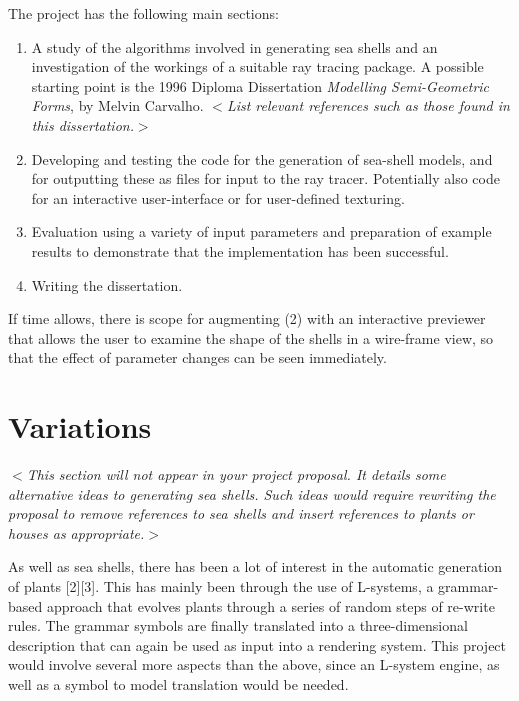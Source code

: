 \documentclass[12pt]{article}
\newcommand{\al}{$<$}
\newcommand{\ar}{$>$}
\begin{document}
The project has the following main sections:

\begin{enumerate}

\item A study of the algorithms involved in generating sea shells and
  an investigation of the workings of a suitable ray tracing package.
  A possible starting point is the 1996 Diploma Dissertation
  \emph{Modelling Semi-Geometric Forms}, by Melvin Carvalho.
  \al\emph{List relevant references such as those found in this
    dissertation.}\ar

\item Developing and testing the code for the generation of sea-shell
  models, and for outputting these as files for input to the ray
  tracer.  Potentially also code for an interactive user-interface or
  for user-defined texturing.

\item Evaluation using a variety of input parameters and preparation
  of example results to demonstrate that the implementation has been
  successful.

\item Writing the dissertation.

\end{enumerate}

If time allows, there is scope for augmenting (2) with an interactive
previewer that allows the user to examine the shape of the shells in a
wire-frame view, so that the effect of parameter changes can be seen
immediately.


\section*{Variations}

\al\emph{This section will not appear in your project proposal.  It
  details some alternative ideas to generating sea shells.  Such ideas
  would require rewriting the proposal to remove references to sea
  shells and insert references to plants or houses as appropriate.}\ar

As well as sea shells, there has been a lot of interest in the
automatic generation of plants [2][3]. This has mainly been through
the use of L-systems, a grammar-based approach that evolves plants
through a series of random steps of re-write rules. The grammar
symbols are finally translated into a three-dimensional description
that can again be used as input into a rendering system. This project
would involve several more aspects than the above, since an L-system
engine, as well as a symbol to model translation would be needed.
\end{document}
